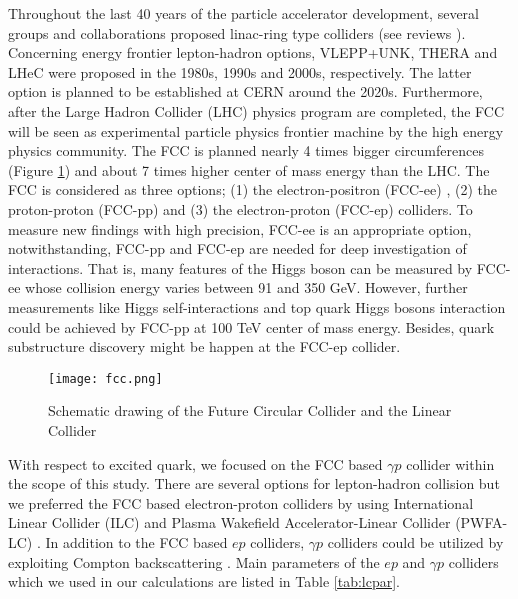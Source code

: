 \documentclass{appolb}
\begin{document}
Throughout the last 40 years of the particle  accelerator development, several groups and collaborations proposed linac-ring type colliders  (see reviews \cite{sultanov1989, wiik1993, brinkmann1997,sultansoy1998, sultansoy1999, sultansoy2004, akay2010}). Concerning energy frontier lepton-hadron options, VLEPP+UNK, THERA and  LHeC were proposed in the 1980s, 1990s and 2000s, respectively. The latter option \cite{abelleira2012}  is planned to be established at CERN around the 2020s. Furthermore, after the Large Hadron Collider (LHC) physics program are completed, the FCC \cite{benedikt2015future}  will be seen as  experimental particle physics frontier machine by  the high energy physics community.  The FCC is planned nearly 4 times bigger circumferences (Figure \ref{fig:fcc})  and about 7 times higher center of mass energy than the LHC. The FCC is considered as three options; (1) the electron-positron (FCC-ee) \cite{wenninger2014future}, (2) the proton-proton (FCC-pp) \cite{wenninger2014} and (3) the electron-proton (FCC-ep) \cite{benedikt2015future} colliders.  To measure new findings with high precision, FCC-ee is an appropriate  option, notwithstanding,  FCC-pp and  FCC-ep are needed for deep investigation of interactions. That is, many features of the Higgs boson can be measured by  FCC-ee whose collision energy varies  between  91 and 350 GeV.  However, further measurements like Higgs self-interactions and top quark Higgs bosons interaction could be achieved by FCC-pp at 100 TeV center of mass energy. Besides,  quark substructure discovery might be happen at the FCC-ep collider. 

\begin{figure}[h!]
	\centering
	\texttt{[image: fcc.png]}%
	\caption{\label{fig:fcc} Schematic drawing of the Future Circular Collider and the Linear Collider}
\end{figure}

With respect to excited quark, we focused on the FCC based $\gamma p$ collider within the scope of this study. There are several options for lepton-hadron  collision but we preferred the FCC based electron-proton colliders by using International Linear Collider (ILC) and Plasma Wakefield Accelerator-Linear Collider (PWFA-LC) \cite{acar2017}. In addition to the FCC based $ep$ colliders, $\gamma p$ colliders  \cite{ciftci1995, aksakal2007} could be utilized by exploiting Compton backscattering \cite{ginzburg1983,ginzburg1984,telnov1990}. Main parameters of the $ep$ and $\gamma p$  colliders which we used in our calculations are listed in Table \ref{tab:lcpar}.
\end{document}
